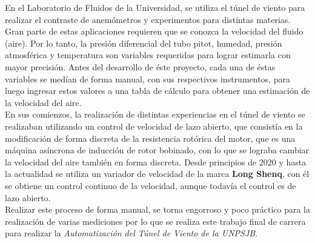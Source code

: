 En el Laboratorio de Fluidos de la Universidad, se utiliza el túnel de viento para realizar el contraste de anemómetros y experimentos para distintas materias. Gran parte de estas aplicaciones requieren que se conozca la velocidad del fluido (aire). Por lo tanto, la presión diferencial del tubo pitot, humedad, presión atmosférica y temperatura son variables requeridas para lograr estimarla con mayor precisión.
Antes del desarrollo de éste proyecto, cada una de éstas variables se medían de forma manual, con sus respectivos instrumentos, para luego ingresar estos valores a una tabla de cálculo para obtener una estimación de la velocidad del aire.\\

En sus comienzos, la realización de distintas experiencias en el túnel de viento se realizaban utilizando un control de velocidad de lazo abierto, que consistía en la modificación de forma discreta de la resistencia rotórica del motor, que es una máquina asíncrona de inducción de rotor bobinado, con lo que se lograba cambiar la velocidad del aire también en forma discreta. Desde principios de 2020 y hasta la actualidad se utiliza un variador de velocidad de la marca \textbf{Long Shenq}, con él se obtiene un control continuo de la velocidad, aunque todavía el control es de lazo abierto. \\

Realizar este proceso de forma manual, se torna engorroso y poco práctico para la realización de varias mediciones por lo que se realiza este trabajo final de carrera para realizar la \textit{Automatización del Túnel de Viento de la UNPSJB}.

\newpage